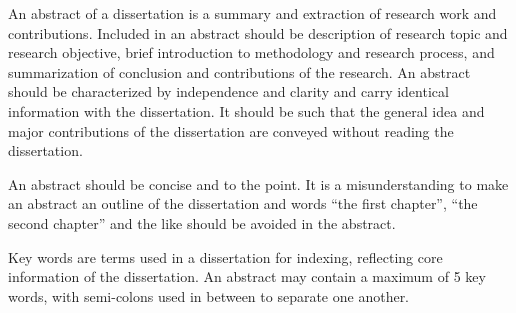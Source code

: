 \begin{eabstract}
   An abstract of a dissertation is a summary and extraction of research work
   and contributions. Included in an abstract should be description of research
   topic and research objective, brief introduction to methodology and research
   process, and summarization of conclusion and contributions of the
   research. An abstract should be characterized by independence and clarity and
   carry identical information with the dissertation. It should be such that the
   general idea and major contributions of the dissertation are conveyed without
   reading the dissertation.

   An abstract should be concise and to the point. It is a misunderstanding to
   make an abstract an outline of the dissertation and words ``the first
   chapter'', ``the second chapter'' and the like should be avoided in the
   abstract.

   Key words are terms used in a dissertation for indexing, reflecting core
   information of the dissertation. An abstract may contain a maximum of 5 key
   words, with semi-colons used in between to separate one another.
\end{eabstract}
